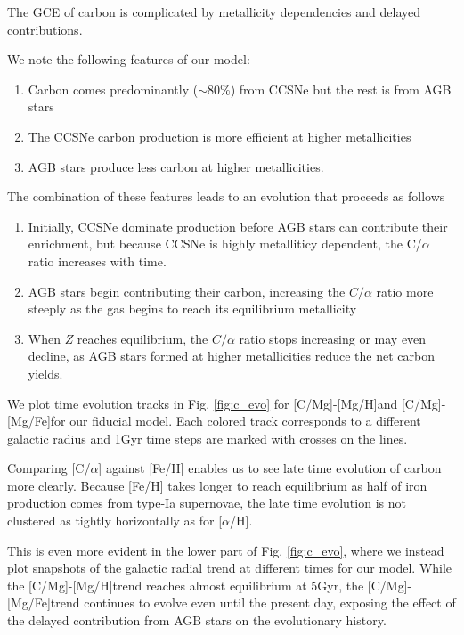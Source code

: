 \documentclass[12pt,oneside]{report}
\newcommand{\caah}{[C/Mg]-[Mg/H]}
\newcommand{\caafe}{[C/Mg]-[Mg/Fe]}
\begin{document}
The GCE of carbon is complicated by metallicity dependencies and delayed contributions. 

We note the following features of our model:

\begin{enumerate}
    \item Carbon comes predominantly ($\sim80\%$) from CCSNe but the rest is from AGB stars
    \item The CCSNe carbon production is more efficient at higher metallicities
    \item AGB stars produce less carbon at higher metallicities.
\end{enumerate}


The combination of these features leads to an evolution that proceeds as follows
\begin{enumerate}
    \item Initially, CCSNe dominate production before AGB stars can contribute their enrichment, but because CCSNe is highly metalliticy dependent, the C/$\alpha$ ratio increases with time.
    \item AGB stars begin contributing their carbon, increasing the $C/\alpha$ ratio more steeply as the gas begins to reach its equilibrium metallicity
    \item When $Z$ reaches equilibrium, the $C/\alpha$ ratio stops increasing or may even decline, as AGB stars formed at higher metallicities reduce the net carbon yields.
\end{enumerate}

We plot time evolution tracks in Fig. \ref{fig:c_evo} for \caah and \caafe for our fiducial model. Each colored track corresponds to a different galactic radius and 1Gyr time steps are marked with crosses on the lines. 

Comparing [C/$\alpha$] against [Fe/H] enables us to see late time evolution of carbon more clearly. Because [Fe/H] takes longer to reach equilibrium as half of iron production comes from type-Ia supernovae, the late time evolution is not clustered as tightly horizontally as for [$\alpha$/H].

This is even more evident in the lower part of Fig. \ref{fig:c_evo}, where we
instead plot snapshots of the galactic radial trend at different times for our
model. While the \caah trend reaches almost equilibrium at 5Gyr, the \caafe trend continues to evolve even until the present day, exposing the effect of the delayed contribution from AGB stars on the evolutionary history.
\end{document}
